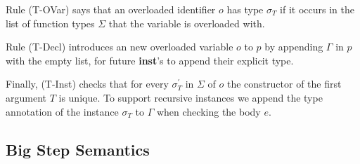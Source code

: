 \documentclass[runningheads]{llncs}
\begin{document}
Rule (T-OVar) says that an overloaded identifier $o$ has type $\sigma_T$ if it occurs in the list of function types $\Sigma$ that the variable is overloaded with. 

Rule (T-Decl) introduces an new overloaded variable $o$ to $p$ by appending $\Gamma$ in $p$ with the empty list, for future \textbf{inst}'s to append their explicit type.

Finally, (T-Inst) checks that for every $\sigma_T^\prime$ in $\Sigma$ of $o$ the constructor of the first argument $T$ is unique. 
To support recursive instances we append the type annotation of the instance $\sigma_T$ to $\Gamma$ when checking the body $e$. 
\subsection{Big Step Semantics}
\label{semantics}
\end{document}

